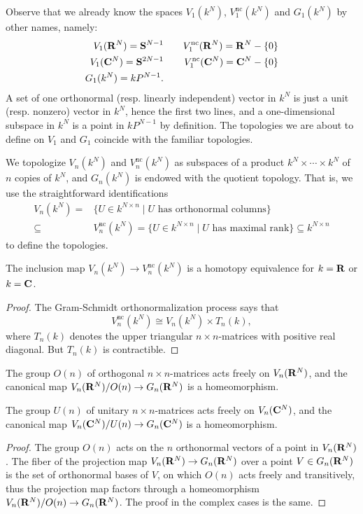 \documentclass[a4paper,openany]{scrbook}
\begin{document}
Observe that we already know the spaces $V_1(k^N)$, $V_1^{\operatorname{nc}}(k^N)$ and $G_1(k^N)$ by other names, namely:
\begin{eqnarray*}
V_1(\mathbf R^{N}) = \mathbf S^{N-1} & \quad & V_1^{\operatorname{nc}}(\mathbf R^N) = \mathbf R^N-\{0\}\\
V_1(\mathbf C^N) = \mathbf S^{2N-1} & \quad & V_1^{\operatorname{nc}}(\mathbf C^N) = \mathbf C^N-\{0\}\\
G_1(k^N) = k P^{N-1}.
\end{eqnarray*}
A set of one orthonormal (resp. linearly independent) vector in $k^N$ is just a unit (resp. nonzero) vector in $k^N$, hence the first two lines, and a one-dimensional subspace in $k^N$ is a point in $k P^{N-1}$ by definition. The topologies we are about to define on $V_1$ and $G_1$ coincide with the familiar topologies.

We topologize $V_n(k^N)$ and $V_n^{\operatorname{nc}}(k^N)$ as subspaces of a product $k^N \times \cdots \times k^N$ of $n$ copies of $k^N$, and $G_n(k^N)$ is endowed with the quotient topology. That is, we use the straightforward identifications
\begin{align*}
V_n(k^N) = & \{ U \in k^{N \times n} \mid U \text{ has orthonormal columns}\} \\
\subseteq & V_n^{\operatorname{nc}}(k^N) = \{ U \in k^{N \times n} \mid U \text{ has maximal rank}\} \subseteq k^{N \times n}
\end{align*}
to define the topologies.

\begin{lemma}
The inclusion map $V_n(k^N) \to V_n^{\operatorname{nc}}(k^N)$ is a homotopy equivalence for $k=\mathbf R$ or $k=\mathbf C$.
\end{lemma}
\begin{proof}
The Gram-Schmidt orthonormalization process says that
\[
V_n^{\operatorname{nc}}(k^N) \cong V_n(k^N) \times T_n(k),
\]
where $T_n(k)$ denotes the upper triangular $n\times n$-matrices with positive real diagonal. But $T_n(k)$ is contractible.
\end{proof}

\begin{lemma} \label{lemma:principalfibrationongrassmannian}
The group $O(n)$ of orthogonal $n\times n$-matrices acts freely on $V_n(\mathbf R^N)$, and the canonical map $V_n(\mathbf R^N)/O(n) \to G_n(\mathbf R^N)$ is a homeomorphism. 

The group $U(n)$ of unitary $n\times n$-matrices acts freely on $V_n(\mathbf C^N)$, and the canonical map $V_n(\mathbf C^N)/U(n) \to G_n(\mathbf C^N)$ is a homeomorphism.
\end{lemma}
\begin{proof}
The group $O(n)$ acts on the $n$ orthonormal vectors of a point in $V_n(\mathbf R^N)$. The fiber of the projection map $V_n(\mathbf R^N) \to G_n(\mathbf R^N)$ over a point $V \in G_n(\mathbf R^N)$ is the set of orthonormal bases of $V$, on which $O(n)$ acts freely and transitively, thus the projection map factors through a homeomorphism $V_n(\mathbf R^N)/O(n) \to G_n(\mathbf R^N)$. The proof in the complex cases is the same.
\end{proof}
\end{document}
